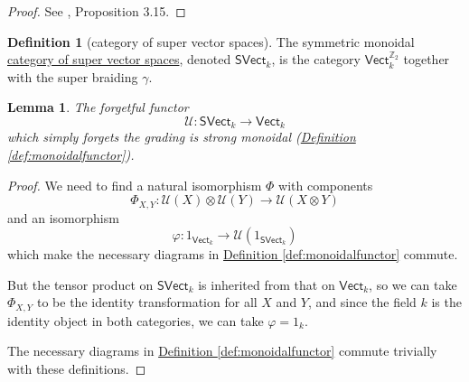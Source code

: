 \documentclass[a4paper,10pt]{scrreprt}
\newcommand{\Z}{\mathbb{Z}}
\newcommand{\defn}[1]{\ul{#1}}
\theoremstyle{definition}
\newtheorem{definition}{Definition}[section]
\theoremstyle{plain}
\newtheorem{lemma}{Lemma}[section]
\theoremstyle{remark}
\begin{document}
\begin{proof}
  See \cite{nlab-deligne-theorem}, Proposition 3.15.
\end{proof}

\begin{definition}[category of super vector spaces]
  \label{def:categoryofsupervectorspaces}
  The symmetric monoidal \defn{category of super vector spaces}, denoted $\mathsf{SVect}_{k}$, is the category $\mathsf{Vect}_{k}^{\Z_{2}}$ together with the super braiding $\gamma$.
\end{definition}

\begin{lemma}
  The forgetful functor 
  \begin{equation*}
    \mathcal{U}\colon \mathsf{SVect}_{k} \to \mathsf{Vect}_{k}
  \end{equation*}
  which simply forgets the grading is strong monoidal (\hyperref[def:monoidalfunctor]{Definition \ref*{def:monoidalfunctor}}).
\end{lemma}
\begin{proof}
  We need to find a natural isomorphism $\Phi$ with components 
  \begin{equation*}
    \Phi_{X, Y}\colon \mathcal{U}(X) \otimes \mathcal{U}(Y) \to \mathcal{U}(X \otimes Y)
  \end{equation*}
  and an isomorphism
  \begin{equation*}
    \varphi\colon 1_{\mathsf{Vect}_{k}} \to \mathcal{U}(1_{\mathsf{SVect}_{k}})
  \end{equation*}
  which make the necessary diagrams in \hyperref[def:monoidalfunctor]{Definition \ref*{def:monoidalfunctor}} commute.

  But the tensor product on $\mathsf{SVect}_{k}$ is inherited from that on $\mathsf{Vect}_{k}$, so we can take $\Phi_{X, Y}$ to be the identity transformation for all $X$ and $Y$, and since the field $k$ is the identity object in both categories, we can take $\varphi = 1_{k}$.

  The necessary diagrams in \hyperref[def:monoidalfunctor]{Definition \ref*{def:monoidalfunctor}} commute trivially with these definitions.
\end{proof} 
\end{document}
